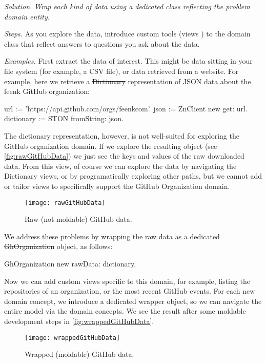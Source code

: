 \documentclass[acmsmall,screen,authorversion,nonacm]{acmart} %
\newcommand\eog[1]{\nbc{Edward}{#1}{purple}}
\newcommand\cp[1]{\nbe{Cesare}{#1}{olive}} %
\newcommand{\patsec}[1]{\noindent\textit{#1.}\xspace}
\begin{document}
\patsec{Solution}
\emph{Wrap each kind of data using a dedicated class reflecting the problem domain entity.}

\patsec{Steps}
As you explore the data, introduce custom tools (views \etc) to the domain class that reflect answers to questions you ask about the data.

\patsec{Examples}
First extract the data of interest.
This might be data sitting in your file system (for example, a CSV file), or data retrieved from a website.
For example, here we retrieve a \st{Dictionary} representation of JSON data about the feenk GitHub organization:

\begin{code}
url := 'https://api.github.com/orgs/feenkcom'.
json := ZnClient new get: url.
dictionary := STON fromString: json.
\end{code}


The dictionary representation, however, is not well-suited for exploring the GitHub organization domain.
If we explore the resulting object (see \autoref{fig:rawGitHubData}) we just see the keys and values of the raw downloaded data.
From this view, of course we can explore the data by navigating the Dictionary views, or by programatically exploring other paths, but we cannot add or tailor views to specifically support the GitHub Organization domain.

\begin{figure}[h]
  \texttt{[image: rawGitHubData]}
  \caption{Raw (not moldable) GitHub data.}
  \label{fig:rawGitHubData}
\end{figure}

We address these problems by wrapping the raw data as a dedicated \st{GhOrganization} object, as follows:
\begin{code}
GhOrganization new rawData: dictionary.
\end{code}

Now we can add custom views specific to this domain, for example, listing the repositories of an organization, or the most recent GitHub events.
For each new domain concept, we introduce a dedicated wrapper object, so we can navigate the entire model via the domain concepts.
We see the result after some moldable development steps in \autoref{fig:wrappedGitHubData}.
\begin{figure}[h]
  \texttt{[image: wrappedGitHubData]}
  \caption{Wrapped (moldable) GitHub data.}
  \label{fig:wrappedGitHubData}
\end{figure}
\end{document}
